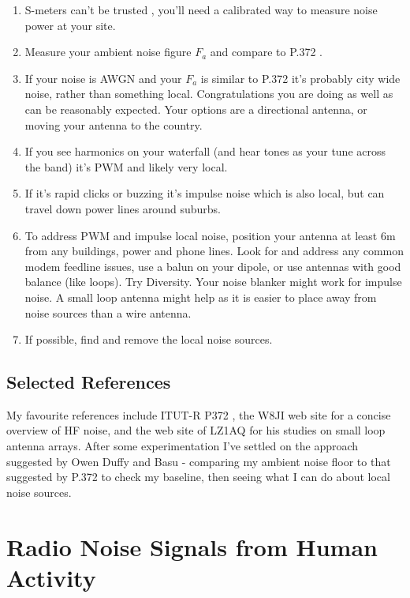 \documentclass{article}
\begin{document}
\begin{enumerate}
\item S-meters can't be trusted \cite{vu2nsb_s_meter}, you'll need a calibrated way to measure noise power at your site.
\item Measure your ambient noise figure $F_a$ and compare to P.372 \cite{itu372-16}.
\item If your noise is AWGN and your $F_a$ is similar to P.372 it's probably city wide noise, rather than something local. Congratulations you are doing as well as can be reasonably expected. Your options are a directional antenna, or moving your antenna to the country.
\item If you see harmonics on your waterfall (and hear tones as your tune across the band) it's PWM and likely very local.
\item If it's rapid clicks or buzzing it's impulse noise which is also local, but can travel down power lines around suburbs. 
\item To address PWM and impulse local noise, position your antenna at least 6m from any buildings, power and phone lines.  Look for and address any common modem feedline issues, use a balun on your dipole, or use antennas with good balance (like loops).  Try Diversity.  Your noise blanker might work for impulse noise.  A small loop antenna might help as it is easier to place away from noise sources than a wire antenna.
\item If possible, find and remove the local noise sources.
\end{enumerate}

\subsection{Selected References}

My favourite references include ITUT-R P372 \cite{itu372-16}, the W8JI web site \cite{w8ji_radio_noise} for a concise overview of HF noise, and the web site of LZ1AQ \cite{lz1aq} for his studies on small loop antenna arrays. After some experimentation \cite{rowetel_noise_city} I've settled on the approach suggested by Owen Duffy \cite{duffy_lig} and Basu \cite{vu2nsb_s_meter} - comparing my ambient noise floor to that suggested by P.372 to check my baseline, then seeing what I can do about local noise sources. 

\section{Radio Noise Signals from Human Activity}
\end{document}

